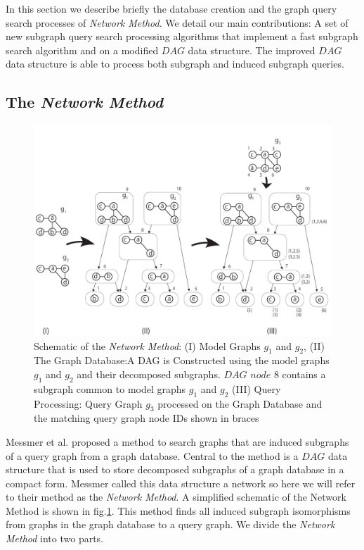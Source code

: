 In this section we describe briefly the database creation and the graph query search processes of  \textit{Network Method}. 
We detail our main contributions: A set of new subgraph query search processing algorithms that implement a fast subgraph search algorithm and on a modified $DAG$ data structure. 
The improved $DAG$ data structure is able to process both subgraph and induced subgraph queries.

\subsection{The \textit{Network Method}}
 

\begin{figure}
\centering
\includegraphics[width=1.0\textwidth]{dag_construction_query_processing6.pdf}
\caption{Schematic of the \textit{Network Method}: (I) Model Graphs $g_1$ and $g_2$, (II) The Graph Database:A DAG is Constructed using  the model graphs $g_1$ and $g_2$ and their decomposed subgraphs. 
$DAG$ $node$ $8$ contains a subgraph common to model graphs $g_1$ and $g_2$  (III) Query Processing: Query Graph $g_3$ processed on the Graph Database and the matching query graph node IDs shown in braces}
\label{fig:fig2}
\end{figure}


Messmer et al.\cite{messmer_bunke2000} proposed a method to search graphs that are induced subgraphs of a query graph from a graph database. 
Central to the method is a $DAG$ data structure that is used to store decomposed subgraphs of a graph database in a compact form. 
Messmer called this data structure a network so here we will refer to their method as the \textit{Network Method}. 
A simplified schematic of the Network Method is shown in fig.\ref{fig:fig2}. 
This method finds all induced subgraph isomorphisms from graphs in the graph database to a query graph.
We divide the \textit{Network Method} into two parts.


